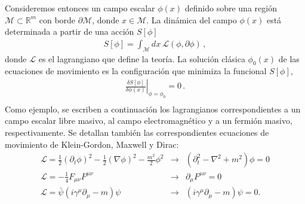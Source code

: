 Consideremos entonces un campo escalar $\phi(x)$ definido sobre una región $\mathcal{M}\subset \mathbb{R}^m$ con borde $\partial \mathcal{M}$, donde $x \in  \mathcal{M}$. La dinámica del campo $\phi(x)$ está determinada a partir de una acción $S[\phi]$
\begin{align}
\label{eq.dinamica_campos}
		S[\phi]=\int_\mathcal{M} dx\ \mathscr L(\phi,\partial\phi)\,,
\end{align}
 donde $\mathscr L$ es el lagrangiano que define la teoría. La solución clásica $\phi _0(x)$ de las ecuaciones de movimiento es la configuración que minimiza la funcional $S[\phi]$,
\begin{equation}
\begin{array}{c}
\left. \frac{\delta S [ \phi ] }{\delta \phi (x)}  \right| _{\phi = \phi _0  } = 0 \, . \\[10pt]
\end{array}
\end{equation}
Como ejemplo, se escriben a continuación los lagrangianos correspondientes a un campo escalar libre masivo, al campo electromagnético y a un fermión masivo, respectivamente. Se detallan también las correspondientes ecuaciones de movimiento de Klein-Gordon, Maxwell y Dirac:
\begin{equation}
\begin{array}{lcl}
\mathscr{L} = \frac{1}{2} (\partial _t \phi ) ^2 - \frac{1}{2} (  \nabla \phi ) ^2 - 
	\frac{m^2}{2} \phi ^2 
&\rightarrow& 
\left(
	\partial _t ^2 - \nabla ^2 + m^2 
		\right) \phi = 0 \\[8pt]
		
\mathscr{L} = - \frac{1}{4} F _{\mu \nu} F ^{\mu \nu}
&\rightarrow&
 \partial _{\mu} F ^{\mu \nu} = 0 \\[8pt]

\mathscr{L} =  { \bar{\psi} } \left(
			i \gamma ^{\mu} \partial _{\mu} - m 
			\right) \psi 
&\rightarrow&
			\left( i  \gamma ^{\mu} \partial _{\mu}  - m \right)\psi = 0.\\[10pt]
\end{array}
\label{campos}
\end{equation}

